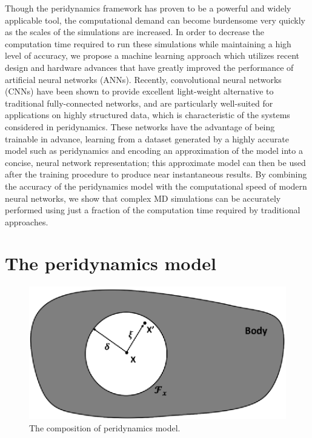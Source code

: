 Though the peridynamics framework has proven to be a powerful and widely applicable tool, the computational demand can become burdensome very quickly as the scales of the simulations are increased.  In order to decrease the computation time required to run these simulations while maintaining a high level of accuracy, we propose a machine learning approach which utilizes recent design and hardware advances that have greatly improved the performance of artificial neural networks (ANNs).  Recently, convolutional neural networks (CNNs) have been shown to provide excellent light-weight alternative to traditional fully-connected networks, and are particularly well-suited for applications on highly structured data, which is characteristic of the systems considered in peridynamics. These networks have the advantage of being trainable in advance, learning from a dataset generated by a highly accurate model such as peridynamics and encoding an approximation of the model into a concise, neural network representation; this approximate model can then be used after the training procedure to produce near instantaneous results.  By combining the accuracy of the peridynamics model with the computational speed of modern neural networks, we show that complex MD simulations can be accurately performed using just a fraction of the computation time required by traditional approaches.

\section{The peridynamics model}
\label{sec:2}

\begin{figure}
  \includegraphics{figure/body.eps}
\caption{The composition of peridynamics model.}
\label{fig:1}       %
\end{figure}

